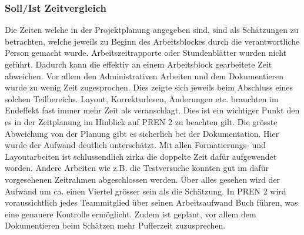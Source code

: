 \subsubsection{Soll/Ist Zeitvergleich}
Die Zeiten welche in der Projektplanung angegeben sind, sind als Schätzungen 
zu betrachten, welche jeweils zu Beginn des Arbeitsblockes durch die 
verantwortliche Person gemacht wurde. Arbeitszeitrapporte oder Stundenblätter wurden 
nicht geführt. Dadurch kann die effektiv an einem Arbeitsblock gearbeitete Zeit 
abweichen. Vor allem den Administrativen Arbeiten und dem Dokumentieren wurde 
zu wenig Zeit zugesprochen. Dies zeigte sich jeweils beim Abschluss eines 
solchen Teilbereichs. Layout, Korrekturlesen, Änderungen etc. brauchten im 
Endeffekt fast immer mehr Zeit als veranschlagt. Dies ist ein wichtiger Punkt 
den es in der Zeitplanung im Hinblick auf PREN 2 zu beachten gilt. Die grösste 
Abweichung von der Planung gibt es sicherlich bei der Dokumentation. Hier wurde 
der Aufwand deutlich unterschätzt. Mit allen Formatierungs- und Layoutarbeiten 
ist schlussendlich zirka die doppelte Zeit dafür aufgewendet worden. Andere 
Arbeiten wie z.B. die Testversuche konnten gut im dafür vorgesehenen Zeitrahmen 
abgeschlossen werden. Über alles gesehen wird der Aufwand um ca. einen Viertel 
grösser sein als die Schätzung. In PREN 2 wird voraussichtlich jedes Teammitglied über seinen Arbeitsaufwand Buch führen, was eine genauere Kontrolle ermöglicht. Zudem ist geplant, vor allem dem Dokumentieren beim Schätzen mehr Pufferzeit zuzusprechen.